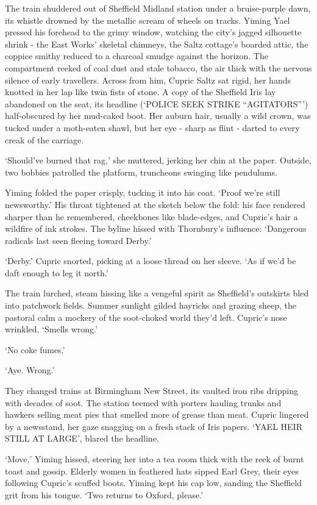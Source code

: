 The train shuddered out of Sheffield Midland station under a bruise-purple dawn, its whistle drowned by the metallic scream of wheels on tracks. Yiming Yael pressed his forehead to the grimy window, watching the city's jagged silhouette shrink - the East Works' skeletal chimneys, the Saltz cottage's boarded attic, the coppice smithy reduced to a charcoal smudge against the horizon. The compartment reeked of coal dust and stale tobacco, the air thick with the nervous silence of early travellers. Across from him, Cupric Saltz sat rigid, her hands knotted in her lap like twin fists of stone. A copy of the Sheffield Iris lay abandoned on the seat, its headline (`POLICE SEEK STRIKE ``AGITATORS''') half-obscured by her mud-caked boot. Her auburn hair, usually a wild crown, was tucked under a moth-eaten shawl, but her eye - sharp as flint - darted to every creak of the carriage.

`Should've burned that rag,' she muttered, jerking her chin at the paper. Outside, two bobbies patrolled the platform, truncheons swinging like pendulums.

Yiming folded the paper crisply, tucking it into his coat. `Proof we're still newsworthy.' His throat tightened at the sketch below the fold: his face rendered sharper than he remembered, cheekbones like blade-edges, and Cupric's hair a wildfire of ink strokes. The byline hissed with Thornbury's influence: `Dangerous radicals last seen fleeing toward Derby.'

`Derby.' Cupric snorted, picking at a loose thread on her sleeve. `As if we'd be daft enough to leg it north.'

The train lurched, steam hissing like a vengeful spirit as Sheffield's outskirts bled into patchwork fields. Summer sunlight gilded hayricks and grazing sheep, the pastoral calm a mockery of the soot-choked world they'd left. Cupric's nose wrinkled. `Smells wrong.'

`No coke fumes.'

`Aye. Wrong.'

They changed trains at Birmingham New Street, its vaulted iron ribs dripping with decades of soot. The station teemed with porters hauling trunks and hawkers selling meat pies that smelled more of grease than meat. Cupric lingered by a newsstand, her gaze snagging on a fresh stack of Iris papers. `YAEL HEIR STILL AT LARGE', blared the headline.

`Move,' Yiming hissed, steering her into a tea room thick with the reek of burnt toast and gossip. Elderly women in feathered hats sipped Earl Grey, their eyes following Cupric's scuffed boots. Yiming kept his cap low, sanding the Sheffield grit from his tongue. `Two returns to Oxford, please.'

